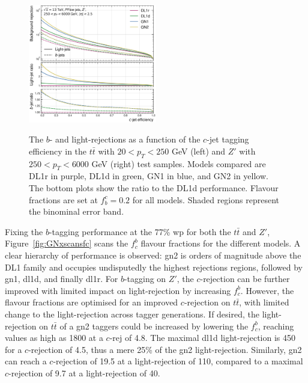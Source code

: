 \begin{center}
\begin{figure}[h!]
{  \includegraphics[width=0.50\textwidth]{Images/FTAG/GN/GN2/rocs/roc_zp_c.png}
  }
  \caption{The $b$- and light-rejections as a function of the $c$-jet tagging efficiency in the $t\bar{t}$ with $20 < p_T < 250$ GeV (left) and $Z'$ with $250 < p_T < 6000$ GeV (right) test samples. Models compared are DL1r in purple, DL1d in green, GN1 in blue, and GN2 in yellow. The bottom plots show the ratio to the DL1d performance. Flavour fractions are set at $f^c_b = 0.2$ for all models. Shaded regions represent the binominal error band.}
  \label{fig:GN2rocc}
  \end{figure}
\end{center}

Fixing the $b$-tagging performance at the 77\% \gls{wp} for both the $t\bar{t}$ and $Z'$, Figure~\ref{fig:GNxscansfc} scans the $f^b_c$ flavour fractions for the different models. A clear hierarchy of performance is observed: \gls{gn2} is orders of magnitude above the DL1 family and occupies undisputedly the highest rejections regions, followed by \gls{gn1}, \gls{dl1d}, and finally \gls{dl1r}. For $b$-tagging on $Z'$, the $c$-rejection can be further improved with limited impact on light-rejection by increasing $f^b_c$. However, the flavour fractions are optimised for an improved $c$-rejection on $t\bar{t}$, with limited change to the light-rejection across tagger generations. If desired, the light-rejection on $t\bar{t}$ of a \gls{gn2} taggers could be increased by lowering the $f^b_c$, reaching values as high as 1800 at a $c$-rej of 4.8. The maximal \gls{dl1d} light-rejection is 450 for a $c$-rejection of 4.5, thus a mere 25\% of the \gls{gn2} light-rejection. Similarly, \gls{gn2} can reach a $c$-rejection of 19.5 at a light-rejection of 110, compared to a maximal $c$-rejection of 9.7 at a light-rejection of 40. \\

